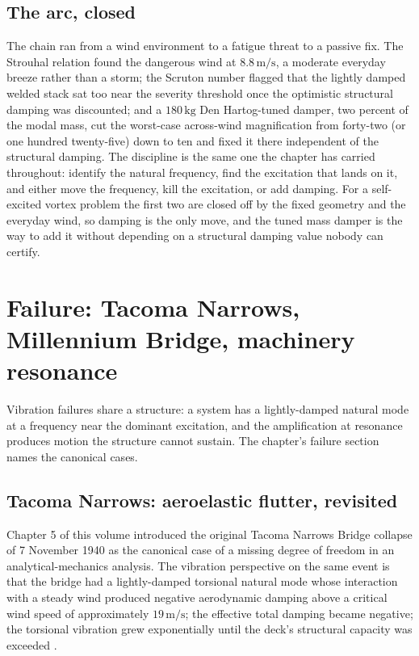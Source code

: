 \subsection{The arc, closed}

The chain ran from a wind environment to a fatigue threat to a passive
fix. The Strouhal relation found the dangerous wind at $8.8\,\si{\meter
\per\second}$, a moderate everyday breeze rather than a storm; the
Scruton number flagged that the lightly damped welded stack sat too near
the severity threshold once the optimistic structural damping was
discounted; and a $180\,\si{\kilogram}$ Den Hartog-tuned damper, two
percent of the modal mass, cut the worst-case across-wind magnification
from forty-two (or one hundred twenty-five) down to ten and fixed it
there independent of the structural damping. The discipline is the same
one the chapter has carried throughout: identify the natural frequency,
find the excitation that lands on it, and either move the frequency, kill
the excitation, or add damping. For a self-excited vortex problem the
first two are closed off by the fixed geometry and the everyday wind, so
damping is the only move, and the tuned mass damper is the way to add it
without depending on a structural damping value nobody can certify.

\section{Failure: Tacoma Narrows, Millennium Bridge, machinery
resonance}

Vibration failures share a structure: a system has a lightly-damped
natural mode at a frequency near the dominant excitation, and the
amplification at resonance produces motion the structure cannot
sustain. The chapter's failure section names the canonical cases.

\subsection{Tacoma Narrows: aeroelastic flutter, revisited}

Chapter 5 of this volume introduced the original Tacoma Narrows
Bridge collapse of 7 November 1940 as the canonical case of a
missing degree of freedom in an analytical-mechanics analysis. The
vibration perspective on the same event is that the bridge had a
lightly-damped torsional natural mode whose interaction with a
steady wind produced negative aerodynamic damping above a critical
wind speed of approximately $19\,\si{\meter\per\second}$; the
effective total damping became negative; the torsional vibration
grew exponentially until the deck's structural capacity was exceeded
\cite{acc:tacoma-narrows-1941}.

